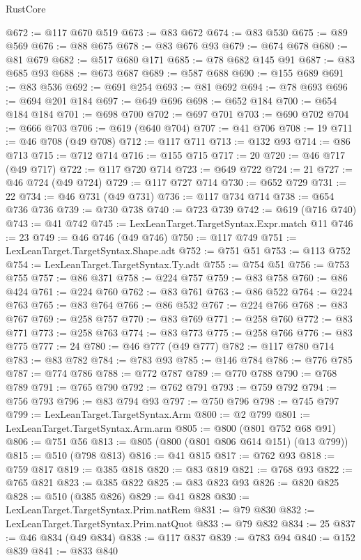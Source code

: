 \begin{lexlean}{RustCore}
\begin{coremodule}
@672 := @117 @670 @519
@673 := @83 @672
@674 := @83 @530
@675 := @89 @569
@676 := @88 @675
@678 := @83 @676 @93
@679 := @674 @678
@680 := @81 @679
@682 := @517 @680 @171
@685 := @78 @682 @145 @91
@687 := @83 @685 @93
@688 := @673 @687
@689 := @587 @688
@690 := @155 @689
@691 := @83 @536
@692 := @691 @254
@693 := @81 @692
@694 := @78 @693
@696 := @694 @201 @184
@697 := @649 @696
@698 := @652 @184
@700 := @654 @184 @184
@701 := @698 @700
@702 := @697 @701
@703 := @690 @702
@704 := @666 @703
@706 := @619 (@640 @704)
@707 := @41 @706
@708 := 19
@711 := @46 @708 (@49 @708)
@712 := @117 @711
@713 := @132 @93
@714 := @86 @713
@715 := @712 @714
@716 := @155 @715
@717 := 20
@720 := @46 @717 (@49 @717)
@722 := @117 @720 @714
@723 := @649 @722
@724 := 21
@727 := @46 @724 (@49 @724)
@729 := @117 @727 @714
@730 := @652 @729
@731 := 22
@734 := @46 @731 (@49 @731)
@736 := @117 @734 @714
@738 := @654 @736 @736
@739 := @730 @738
@740 := @723 @739
@742 := @619 (@716 @740)
@743 := @41 @742
@745 := LexLeanTarget.TargetSyntax.Expr.match @11
@746 := 23
@749 := @46 @746 (@49 @746)
@750 := @117 @749
@751 := LexLeanTarget.TargetSyntax.Shape.adt
@752 := @751 @51
@753 := @113 @752
@754 := LexLeanTarget.TargetSyntax.Ty.adt
@755 := @754 @51
@756 := @753 @755
@757 := @86 @371
@758 := @224 @757
@759 := @83 @758
@760 := @86 @424
@761 := @224 @760
@762 := @83 @761
@763 := @86 @522
@764 := @224 @763
@765 := @83 @764
@766 := @86 @532
@767 := @224 @766
@768 := @83 @767
@769 := @258 @757
@770 := @83 @769
@771 := @258 @760
@772 := @83 @771
@773 := @258 @763
@774 := @83 @773
@775 := @258 @766
@776 := @83 @775
@777 := 24
@780 := @46 @777 (@49 @777)
@782 := @117 @780 @714
@783 := @83 @782
@784 := @783 @93
@785 := @146 @784
@786 := @776 @785
@787 := @774 @786
@788 := @772 @787
@789 := @770 @788
@790 := @768 @789
@791 := @765 @790
@792 := @762 @791
@793 := @759 @792
@794 := @756 @793
@796 := @83 @794 @93
@797 := @750 @796
@798 := @745 @797
@799 := LexLeanTarget.TargetSyntax.Arm
@800 := @2 @799
@801 := LexLeanTarget.TargetSyntax.Arm.arm
@805 := @800 (@801 @752 @68 @91)
@806 := @751 @56
@813 := @805 (@800 (@801 @806 @614 @151) (@13 @799))
@815 := @510 (@798 @813)
@816 := @41 @815
@817 := @762 @93
@818 := @759 @817
@819 := @385 @818
@820 := @83 @819
@821 := @768 @93
@822 := @765 @821
@823 := @385 @822
@825 := @83 @823 @93
@826 := @820 @825
@828 := @510 (@385 @826)
@829 := @41 @828
@830 := LexLeanTarget.TargetSyntax.Prim.natRem
@831 := @79 @830
@832 := LexLeanTarget.TargetSyntax.Prim.natQuot
@833 := @79 @832
@834 := 25
@837 := @46 @834 (@49 @834)
@838 := @117 @837
@839 := @783 @94
@840 := @152 @839
@841 := @833 @840

\end{coremodule}
\end{lexlean}
